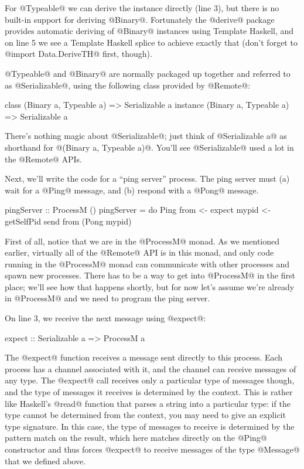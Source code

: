 For @Typeable@ we can derive the instance directly (line 3), but there
is no built-in support for deriving @Binary@.  Fortunately the
@derive@ package provides automatic deriving of @Binary@ instances
using Template Haskell, and on line 5 we see a Template Haskell splice
to achieve exactly that (don't forget to @import Data.DeriveTH@ first,
though).

@Typeable@ and @Binary@ are normally packaged up together and referred
to as @Serializable@, using the following class provided by @Remote@:

\begin{haskell}
class (Binary a, Typeable a) => Serializable a
instance (Binary a, Typeable a) => Serializable a
\end{haskell}

There's nothing magic about @Serializable@; just think of
@Serializable a@ as shorthand for @(Binary a, Typeable a)@.  You'll
see @Serializable@ used a lot in the @Remote@ APIs.


Next, we'll write the code for a ``ping server'' process.  The ping
server must (a) wait for a @Ping@ message, and (b) respond with a
@Pong@ message.

\begin{haskell}
pingServer :: ProcessM ()
pingServer = do
  Ping from <- expect
  mypid <- getSelfPid
  send from (Pong mypid)
\end{haskell}

First of all, notice that we are in the @ProcessM@ monad.  As we
mentioned earlier, virtually all of the @Remote@ API is in this monad,
and only code running in the @ProcessM@ monad can communicate with
other processes and spawn new processes.  There has to be a way to get
into @ProcessM@ in the first place; we'll see how that happens
shortly, but for now let's assume we're already in @ProcessM@ and we
need to program the ping server.

On line 3, we receive the next message using @expect@:

\begin{haskell}
expect :: Serializable a => ProcessM a
\end{haskell}

The @expect@ function receives a message sent directly to this
process.  Each process has a channel associated with it, and the
channel can receive messages of any type.  The @expect@ call receives
only a particular type of messages though, and the type of messages it
receives is determined by the context.  This is rather like Haskell's
@read@ function that parses a string into a particular type: if the
type cannot be determined from the context, you may need to give an
explicit type signature.  In this case, the type of messages to
receive is determined by the pattern match on the result, which here
matches directly on the @Ping@ constructor and thus forces @expect@ to
receive messages of the type @Message@ that we defined above.

